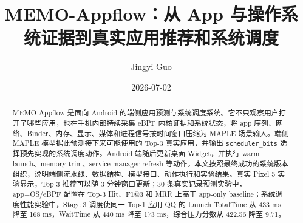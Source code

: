 \documentclass[UTF8,zihao=-4]{ctexart}
\title{\textbf{MEMO-Appflow：从 App 与操作系统证据到真实应用推荐和系统调度}}
\author{Jingyi Guo}
\date{2026-07-02}
\begin{document}
\maketitle

\begin{abstract}
MEMO-Appflow 是面向 Android 的端侧应用预测与系统调度系统。它不只观察用户打开了哪些应用，也在手机内部持续采集 eBPF 内核证据和系统状态，将 app 序列、网络、Binder、内存、显示、媒体和进程信号按时间窗口压缩为 MAPLE 场景输入。端侧 MAPLE 模型据此预测接下来可能使用的 Top-3 真实应用，并输出 \texttt{scheduler\_bits} 选择预先实现的系统调度动作。Android 端随后更新桌面 Widget，并执行 warm launch、memory trim、service manager refresh 等动作。本文按照最终成功的系统版本组织，说明端侧流水线、数据结构、模型接口、动作执行和实验结果。真实 Pixel 5 实验显示，Top-3 推荐可以随 3 分钟窗口更新；30 条真实记录预测实验中，app+OS/eBPF 配置在 Top-3 Hit、F1@3 和 MRR 上高于 app-only baseline；系统调度性能实验中，Stage 3 调度使同一 Top-1 应用 QQ 的 Launch TotalTime 从 433 ms 降至 168 ms，WaitTime 从 440 ms 降至 173 ms，综合压力分数从 422.56 降至 9.71。
\end{abstract}

\tableofcontents
\newpage


\end{document}
